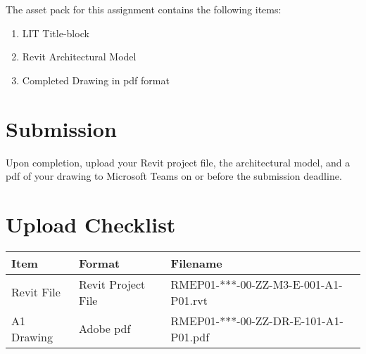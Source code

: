 The asset pack for this assignment contains the following items:
\begin{enumerate}
	\item LIT Title-block
	\item Revit Architectural Model
	\item Completed Drawing in pdf format
\end{enumerate}


\section*{Submission}
Upon completion, upload your Revit project file, the architectural model, and a pdf of your drawing to Microsoft Teams on or before the submission deadline.


\section*{Upload Checklist}

\begin{tabular}{|l|l|l|}
	\hline
	\textbf{Item} & \textbf{Format} & \textbf{Filename} \\
	\hline
	Revit File  & Revit Project File & RMEP01-***-00-ZZ-M3-E-001-A1-P01.rvt  \\
	A1 Drawing  & Adobe pdf & RMEP01-***-00-ZZ-DR-E-101-A1-P01.pdf  \\
	\hline
\end{tabular}


